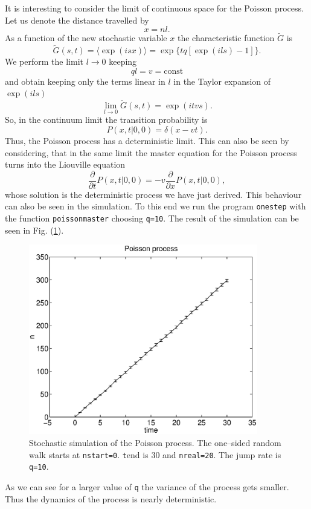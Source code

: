 It is interesting to consider the limit of continuous space for the
Poisson process. Let us denote the distance travelled by 
\begin{equation*}
x=nl.
\end{equation*}
As a function of the new stochastic variable $x$ the 
characteristic function $\tilde{G}$ is
\begin{equation*}
\tilde{G}(s,t) = \langle \exp(isx) \rangle = 
     \exp\{tq[\exp(ils)-1] \}.
\end{equation*}
We perform the limit $l \longrightarrow 0$ keeping 
\begin{equation*}
ql=v=\text{const}
\end{equation*}
and obtain keeping only the terms linear in $l$ in the Taylor
expansion of $\exp(ils)$
\begin{equation*}
\lim_{l\rightarrow 0}\tilde{G}(s,t) = \exp(itvs).
\end{equation*}
So, in the continuum limit the transition probability is
\begin{equation*}
P(x,t|0,0) = \delta(x-vt).
\end{equation*}
Thus, the Poisson process has a deterministic limit. This can also 
be seen by considering, that in the same limit the master equation
for the Poisson process turns into the Liouville equation
\begin{equation*}
\frac{\partial}{\partial t} P(x,t|0,0) = -v 
\frac{\partial}{\partial x} P(x,t|0,0),
\end{equation*}
whose solution is the deterministic process we have just derived.
This behaviour can also be seen in the simulation. To this end
we run the program \texttt{onestep} with the function 
\texttt{poissonmaster} choosing \texttt{q=10}. The result of the 
simulation can be seen in Fig. (\ref{F_OS_POI_2}).
\begin{figure}
\label{F_OS_POI_2}
\includegraphics[width=10cm]{./Figures/f_os_poi_2.eps}
\caption{Stochastic simulation of the Poisson process. The 
one--sided random walk starts at \texttt{nstart=0}.  
{\texttt tend} is 30 and \texttt{nreal=20}.
The jump rate is \texttt{q=10}.}
\end{figure}
As we can see for a larger value of \texttt{q} the variance of the
process gets smaller. Thus the dynamics of the process is nearly 
deterministic.

